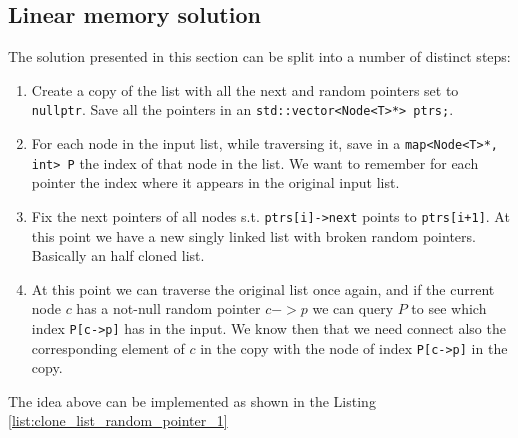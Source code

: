 \subsection{Linear memory solution}
\label{clone_list_random_pointer:sec:bruteforce}
The solution presented in this section can be split into a number of distinct steps:
\begin{enumerate}
	\item Create a copy of the list with all the  next and random pointers set to \lstinline[columns=fixed]{nullptr}. Save all the pointers in an \lstinline[columns=fixed]{std::vector<Node<T>*> ptrs;}.
	\item For each node in the input list, while traversing it, save in a \lstinline[columns=fixed]{map<Node<T>*, int> P} the index of that node in the list. We want to remember for each pointer the index where it appears in the original input list. 
	\item Fix the next pointers of all nodes s.t. \lstinline[columns=fixed]{ptrs[i]->next} points to  \lstinline[columns=fixed]{ptrs[i+1]}. At this point we have a new singly linked list with broken random pointers. Basically an half cloned list.
	\item At this point we can traverse the original list once again, and if the current node $c$ has a not-null random pointer $c->p$ we can query $P$ to see which index \lstinline[columns=fixed]{P[c->p]} has in the input. We know then that we need connect also the corresponding element of $c$ in the copy with the node of index \lstinline[columns=fixed]{P[c->p]} in the copy.
\end{enumerate}

The idea above can be implemented as shown in the Listing \ref{list:clone_list_random_pointer_1}




